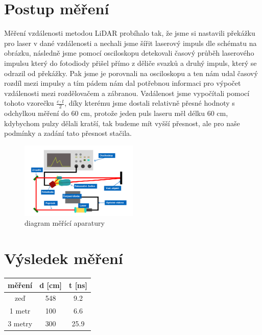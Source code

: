 \documentclass[12pt,a4paper]{article}
\begin{document}
\section{Postup měření}
Měření vzdálenosti metodou LiDAR probíhalo tak, že jsme si nastavili překážku pro laser v dané vzdálenosti a nechali jsme šířit laserový impuls dle schématu na obrázku, následně jsme pomocí osciloskopu detekovali časový průběh laserového impulsu který do fotodiody přišel přímo z děliče svazků a druhý impuls, který se odrazil od překážky. Pak jsme je porovnali na osciloskopu a ten nám udal časový rozdíl mezi impulsy a tím pádem nám dal potřebnou informaci pro výpočet vzdálenosti mezi rozdělovačem a zábranou. Vzdálenost jsme vypočítali pomocí tohoto vzorečku $\frac{c \cdot t}{2}$, díky kterému jsme dostali relativně přesné hodnoty s odchylkou měření do 60 cm, protože jeden puls laseru měl délku 60 cm, kdybychom pulzy dělali kratší, tak budeme mít vyšší přesnost, ale pro naše podmínky a zadání tato přesnost stačila.
\begin{figure}[h!]
    \centering
    \includegraphics[width=0.5\textwidth]{Diagram měření.png}
    \caption{diagram měřící aparatury}
\end{figure}

\section{Výsledek měření}

\begin{center}
    \begin{tabular}{||c c c||} 
     \hline
      měření & d [cm] & t [ns] \\ [0.5ex] 
     \hline\hline
     zeď & 548 & 9.2 \\ 
     \hline
     1 metr & 100 & 6.6 \\
     \hline
     3 metry & 300 & 25.9 \\
     \hline
    \end{tabular}
    \end{center}
    
\end{document}
